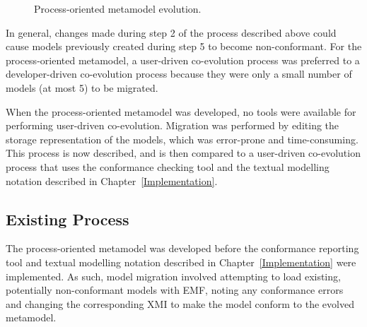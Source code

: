 \begin{figure}[htbp]
	\centering
	\caption{Process-oriented metamodel evolution.}
\label{fig:po_mms}
\end{figure}

In general, changes made during step 2 of the process described above could cause models previously created during step 5 to become non-conformant. For the process-oriented metamodel, a user-driven co-evolution process was preferred to a developer-driven co-evolution process because they were only a small number of models (at most 5) to be migrated.

When the process-oriented metamodel was developed, no tools were available for performing user-driven co-evolution. Migration was performed by editing the storage representation of the models, which was error-prone and time-consuming. This process is now described, and is then compared to a user-driven co-evolution process that uses the conformance checking tool and the textual modelling notation described in Chapter~\ref{Implementation}.

\subsection{Existing Process}
The process-oriented metamodel was developed before the conformance reporting tool and textual modelling notation described in Chapter~\ref{Implementation} were implemented. As such, model migration involved attempting to load existing, potentially non-conformant models with EMF, noting any conformance errors and changing the corresponding XMI to make the model conform to the evolved metamodel.

